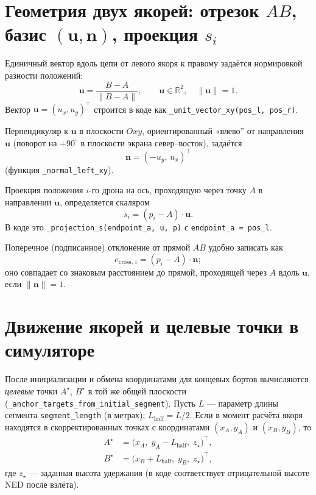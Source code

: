 \documentclass[12pt,a4paper]{article}
\begin{document}
\section{Геометрия двух якорей: отрезок $AB$, базис $(\mathbf{u}, \mathbf{n})$, проекция $s_i$}

Единичный вектор вдоль цепи от левого якоря к правому задаётся нормировкой разности положений:
\begin{equation}
  \mathbf{u} = \frac{B - A}{\lVert B - A \rVert}, \qquad
  \mathbf{u} \in \mathbb{R}^2, \quad \lVert \mathbf{u} \rVert = 1.
\end{equation}
Вектор $\mathbf{u} = (u_x, u_y)^\top$ строится в коде как \texttt{\_unit\_vector\_xy(pos\_l, pos\_r)}.

Перпендикуляр к $\mathbf{u}$ в плоскости $Oxy$, ориентированный «влево'' от направления $\mathbf{u}$ (поворот на $+90^\circ$ в плоскости экрана север--восток), задаётся
\begin{equation}
  \mathbf{n} = (-u_y,\, u_x)^\top
\end{equation}
(функция \texttt{\_normal\_left\_xy}).

Проекция положения $i$-го дрона на ось, проходящую через точку $A$ в направлении $\mathbf{u}$, определяется скаляром
\begin{equation}
  s_i = (p_i - A) \cdot \mathbf{u}.
\end{equation}
В коде это \texttt{\_projection\_s(endpoint\_a, u, p)} с \texttt{endpoint\_a = pos\_l}.

Поперечное (подписанное) отклонение от прямой $AB$ удобно записать как
\begin{equation}
  e_{\mathrm{cross},\,i} = (p_i - A) \cdot \mathbf{n};
\end{equation}
оно совпадает со знаковым расстоянием до прямой, проходящей через $A$ вдоль $\mathbf{u}$, если $\lVert \mathbf{n} \rVert = 1$.

\section{Движение якорей и целевые точки в симуляторе}

После инициализации и обмена координатами для концевых бортов вычисляются \emph{целевые} точки $A^\star$, $B^\star$ в той же общей плоскости (\texttt{\_anchor\_targets\_from\_initial\_segment}). Пусть $L$ --- параметр длины сегмента \texttt{segment\_length} (в метрах); $L_{\mathrm{half}} = L/2$. Если в момент расчёта якоря находятся в скорректированных точках с координатами $(x_A, y_A)$ и $(x_B, y_B)$, то
\begin{align}
  A^\star &= \bigl(x_A,\; y_A - L_{\mathrm{half}},\; z_\star\bigr)^\top, \\
  B^\star &= \bigl(x_B + L_{\mathrm{half}},\; y_B,\; z_\star\bigr)^\top,
\end{align}
где $z_\star$ --- заданная высота удержания (в коде соответствует отрицательной высоте NED после взлёта).
\end{document}
